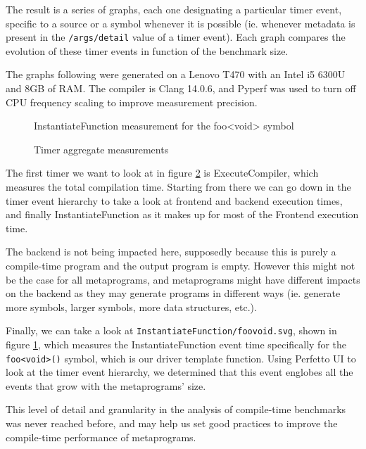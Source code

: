 \documentclass[../main]{subfiles}
\begin{document}
The result is a series of graphs, each one designating a particular timer event,
specific to a source or a symbol whenever it is possible (ie. whenever metadata
is present in the \lstinline{/args/detail} value of a timer event). Each graph
compares the evolution of these timer events in function of the benchmark size.

The graphs following were generated on a Lenovo T470 with an Intel i5 6300U and
8GB of RAM. The compiler is Clang 14.0.6, and Pyperf \cite{pyperf} was used
to turn off CPU frequency scaling to improve measurement precision.

\begin{figure}[h]
\fontsize{8}{10}\selectfont

\caption{InstantiateFunction measurement for the foo<void> symbol}
\label{fig:instantiate-foo-void}
\end{figure}

\begin{figure}[h]
\fontsize{8}{10}\selectfont

\caption{Timer aggregate measurements}
\label{fig:total-timers}
\end{figure}

The first timer we want to look at in figure \ref{fig:total-timers} is
ExecuteCompiler, which measures the total compilation time.
Starting from there we can go down in the timer event hierarchy to take a look
at frontend and backend execution times, and finally InstantiateFunction as
it makes up for most of the Frontend execution time.

The backend is not being impacted here, supposedly because this is purely a
compile-time program and the output program is empty. However this might not be
the case for all metaprograms, and metaprograms might have different impacts on
the backend as they may generate programs in different ways (ie. generate more
symbols, larger symbols, more data structures, etc.).

Finally, we can take a look at \lstinline{InstantiateFunction/foovoid.svg},
shown in figure \ref{fig:instantiate-foo-void}, which measures the
InstantiateFunction event time specifically for the \lstinline{foo<void>()}
symbol, which is our driver template function. Using Perfetto UI to look at the
timer event hierarchy, we determined that this event englobes all the events
that grow with the metaprograms' size.

This level of detail and granularity in the analysis of compile-time benchmarks
was never reached before, and may help us set good practices to improve the
compile-time performance of metaprograms.
\end{document}
